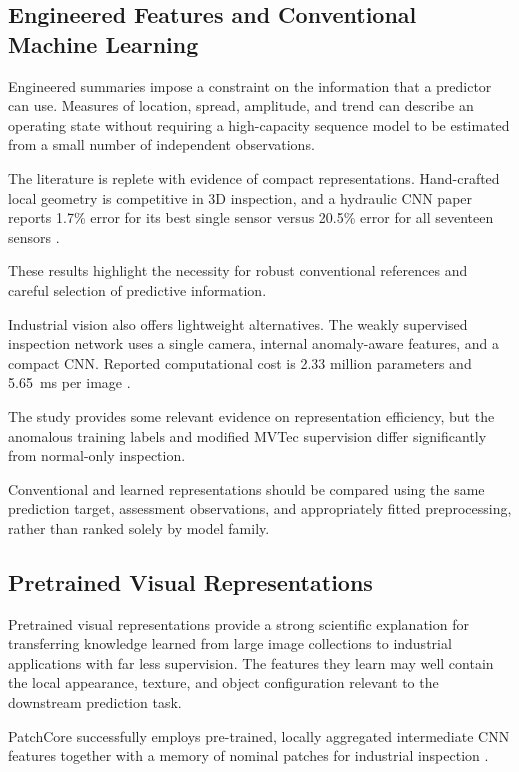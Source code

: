 \subsection{Engineered Features and Conventional Machine Learning}

Engineered summaries impose a constraint on the information that a predictor can use. Measures of
location, spread, amplitude, and trend can describe an operating state without requiring a
high-capacity sequence model to be estimated from a small number of independent observations.

The literature is replete with evidence of compact representations. Hand-crafted local geometry is
competitive in 3D inspection, and a hydraulic CNN paper reports 1.7\% error for its best single
sensor versus 20.5\% error for all seventeen sensors \parencite{Horwitz2023Back,Goodarzi2023Deep}.

These results highlight the necessity for robust conventional references and careful selection of
predictive information.

Industrial vision also offers lightweight alternatives. The weakly supervised inspection network
uses a single camera, internal anomaly-aware features, and a compact CNN. Reported computational
cost is 2.33 million parameters and 5.65~ms per image \parencite[Table~V]{P035}.

The study provides some relevant evidence on representation efficiency, but the anomalous training
labels and modified MVTec supervision differ significantly from normal-only inspection.

Conventional and learned representations should be compared using the same prediction target,
assessment observations, and appropriately fitted preprocessing, rather than ranked solely by model
family.

\subsection{Pretrained Visual Representations}

Pretrained visual representations provide a strong scientific explanation for transferring knowledge
learned from large image collections to industrial applications with far less supervision. The
features they learn may well contain the local appearance, texture, and object configuration
relevant to the downstream prediction task.

PatchCore successfully employs pre-trained, locally aggregated intermediate CNN features together
with a memory of nominal patches for industrial inspection \parencite[Section~3]{Roth2022Towards}.

